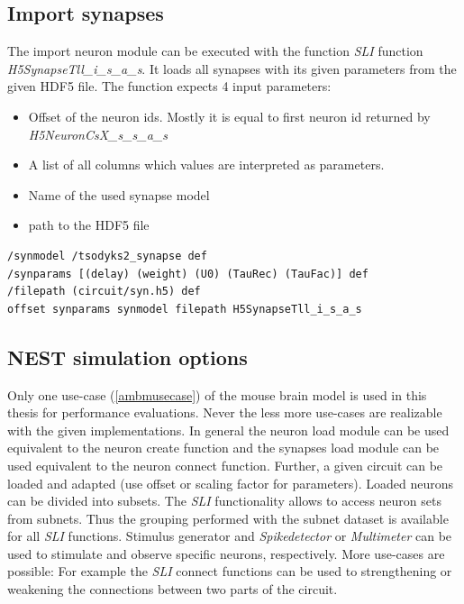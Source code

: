 \subsection{Import synapses}
The import neuron module can be executed with the function \emph{SLI} function  \emph{H5SynapseTll\_i\_s\_a\_s}. It loads all synapses with its given parameters
from the given HDF5 file. The function expects 4 input parameters:
 
\begin{itemize}
      \item Offset of the neuron ids. Mostly it is equal to first neuron id returned by \emph{H5NeuronCsX\_s\_s\_a\_s}

      \item A list of all columns which values are interpreted as parameters.
      
      \item Name of the used synapse model
      
      \item path to the HDF5 file 
\end{itemize}

\begin{lstlisting}[label=sliSynapses,caption=Example importing synapses]
/synmodel /tsodyks2_synapse def
/synparams [(delay) (weight) (U0) (TauRec) (TauFac)] def
/filepath (circuit/syn.h5) def
offset synparams synmodel filepath H5SynapseTll_i_s_a_s
\end{lstlisting}

\subsection{NEST simulation options}

Only one use-case (\ref{ambmusecase}) of the mouse brain model is used in this thesis for performance evaluations.
Never the less more use-cases are realizable with the given implementations.
In general the neuron load module can be used equivalent to the neuron create function
and the synapses load module can be used equivalent to the neuron connect function.
Further, a given circuit can be loaded and adapted (use offset or scaling factor for parameters).
Loaded neurons can be divided into subsets. The \emph{SLI} functionality allows to access neuron sets
from subnets. Thus the grouping performed with the subnet dataset is available for all \emph{SLI} functions.
Stimulus generator and \emph{Spikedetector} or \emph{Multimeter} can be used to stimulate
and observe specific neurons, respectively.
More use-cases are possible: For example the \emph{SLI} connect functions can be used to strengthening or weakening the connections between two
parts of the circuit.

